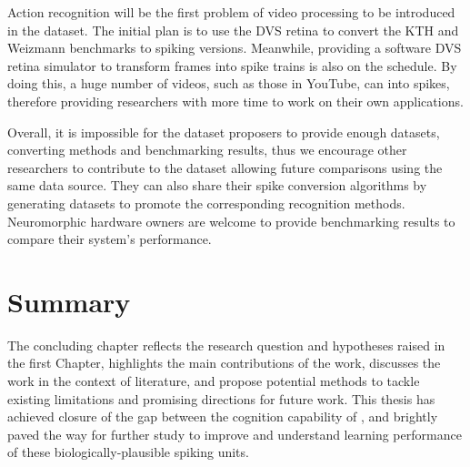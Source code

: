 Action recognition will be the first problem of video processing to be introduced in the dataset.
The initial plan is to use the DVS retina to convert the KTH and Weizmann benchmarks to spiking versions.
Meanwhile, providing a software DVS retina simulator to transform frames into spike trains is also on the schedule.
By doing this, a huge number of videos, such as those in YouTube, can \DIFdelbegin {}\DIFdelend \DIFaddbegin {}\DIFaddend into spikes, therefore providing researchers with more time to work on their own applications.

Overall, it is impossible for the dataset proposers to provide enough datasets, converting methods and benchmarking results, thus we encourage other researchers to contribute to the dataset allowing future comparisons using the same data source.
They can also share their spike conversion algorithms by generating datasets to promote the corresponding recognition methods.
Neuromorphic hardware owners are welcome to provide benchmarking results to compare their system's performance.
\section{Summary}

The concluding chapter reflects the research question and hypotheses raised in the first Chapter, highlights the main contributions of the work, discusses the work in the context of literature, and propose potential methods to tackle existing limitations and promising directions for future work.
This thesis has achieved closure of the gap between the cognition capability of \DIFdelbegin {}\DIFdelend \DIFaddbegin {}\DIFaddend , and brightly paved the way for further study to improve and understand \DIFaddbegin {}\DIFaddend learning performance of these biologically-plausible spiking units.